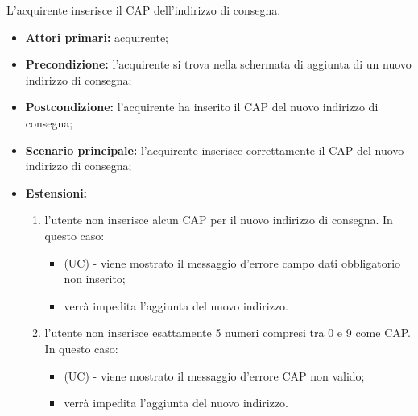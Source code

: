 L'acquirente inserisce il CAP dell'indirizzo di consegna.
\begin{itemize}
    \item \textbf{Attori primari:} acquirente;
    \item \textbf{Precondizione:} l'acquirente si trova nella schermata di aggiunta di un nuovo indirizzo di consegna;
    \item \textbf{Postcondizione:} l'acquirente ha inserito il CAP del nuovo indirizzo di consegna;
    \item \textbf{Scenario principale:} l'acquirente inserisce correttamente il CAP del nuovo indirizzo di consegna;
    \item \textbf{Estensioni:}
    \begin{enumerate}[label=\lett]
        \item l'utente non inserisce alcun CAP per il nuovo indirizzo di consegna. In questo caso:
        \begin{itemize}
            \item (UC) - viene mostrato il messaggio d'errore campo dati obbligatorio non inserito;
            \item verrà impedita l'aggiunta del nuovo indirizzo.
        \end{itemize}
        \item l'utente non inserisce esattamente 5 numeri compresi tra 0 e 9 come CAP. In questo caso:
        \begin{itemize}
            \item (UC) - viene mostrato il messaggio d'errore CAP non valido;
            \item verrà impedita l'aggiunta del nuovo indirizzo.
        \end{itemize}
    \end{enumerate}
\end{itemize}


